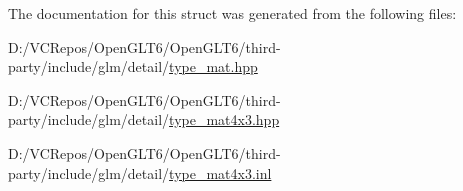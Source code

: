 The documentation for this struct was generated from the following files\+:\begin{DoxyCompactItemize}
\item 
D\+:/\+V\+C\+Repos/\+Open\+G\+L\+T6/\+Open\+G\+L\+T6/third-\/party/include/glm/detail/\mbox{\hyperlink{type__mat_8hpp}{type\+\_\+mat.\+hpp}}\item 
D\+:/\+V\+C\+Repos/\+Open\+G\+L\+T6/\+Open\+G\+L\+T6/third-\/party/include/glm/detail/\mbox{\hyperlink{type__mat4x3_8hpp}{type\+\_\+mat4x3.\+hpp}}\item 
D\+:/\+V\+C\+Repos/\+Open\+G\+L\+T6/\+Open\+G\+L\+T6/third-\/party/include/glm/detail/\mbox{\hyperlink{type__mat4x3_8inl}{type\+\_\+mat4x3.\+inl}}\end{DoxyCompactItemize}
